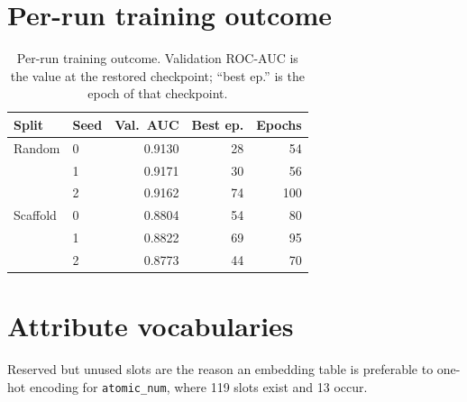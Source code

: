 \section{Per-run training outcome}

\begin{table}[htb]
    \centering
    \caption{Per-run training outcome. Validation ROC-AUC is the value at the restored checkpoint; ``best ep.'' is the epoch of that checkpoint.}
    \label{tab:seeds}
    \footnotesize
    \begin{tabular}{@{}llrrr@{}}
        \toprule
        Split & Seed & Val.\ AUC & Best ep. & Epochs \\
        \midrule
        Random   & 0 & 0.9130 & 28 &  54 \\
                 & 1 & 0.9171 & 30 &  56 \\
                 & 2 & 0.9162 & 74 & 100 \\
        \midrule
        Scaffold & 0 & 0.8804 & 54 &  80 \\
                 & 1 & 0.8822 & 69 &  95 \\
                 & 2 & 0.8773 & 44 &  70 \\
        \bottomrule
    \end{tabular}
\end{table}

\section{Attribute vocabularies}
\label{sec:vocab}

Reserved but unused slots are the reason an embedding table is preferable to one-hot encoding for \texttt{atomic\_\allowbreak{}num}, where 119 slots exist and 13 occur.

